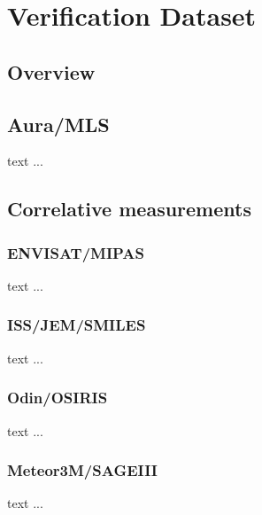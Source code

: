 \chapter{Verification Dataset}
\label{chapter:vds}


\section{Overview}


\section{Aura/MLS}

text ...

\section{Correlative measurements}

\subsection{ENVISAT/MIPAS}

text ...

\subsection{ISS/JEM/SMILES}

text ...

\subsection{Odin/OSIRIS}
 
text ...

\subsection{Meteor3M/SAGEIII}

text ...


